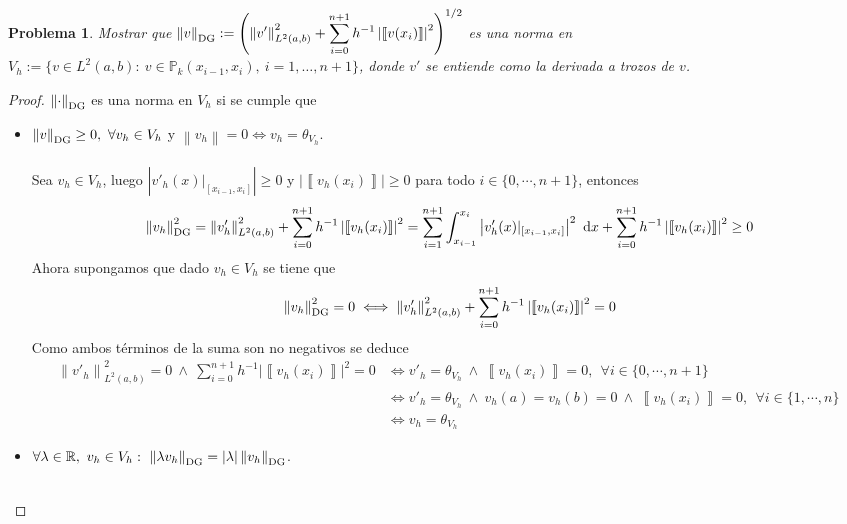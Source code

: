 \documentclass[10pt,a4paper]{report}
\newtheorem{pro}{Problema}
\newcommand{\dx}{\textup{d}x}
\providecommand{\abs}[1]{\left\lvert#1\right\rvert}
\providecommand{\norm}[1]{\left\lVert#1\right\rVert}
\providecommand{\salto}[1]{\left\llbracket#1\right\rrbracket}
\begin{document}
    \begin{pro}
    	Mostrar que $\displaystyle \norm{v}_{\textup{DG}} := \left( \norm{v'}^{2}_{L^{2}(a,b)} + \sum_{i=0}^{n+1}h^{-1}\abs{\salto{v(x_{i})}}^{2}  \right)^{1/2}$ es una norma en $V_{h} := \{ v\in L^{2}(a,b):\ v\in \mathbb{P}_{k}(x_{i-1},x_{i}),\ i = 1,\dots,n+1 \}$, donde $v'$ se entiende como la derivada a trozos de $v$.
    \end{pro}
    \begin{proof}
    	$\norm{\cdot}_{\textup{DG}}$ es una norma en $V_{h}$ si se cumple que
    	\begin{itemize}
    		\item[$(i)$] $\norm{v}_{\textup{DG}} \geq 0, \ \forall v_{h}\in V_{h}$ y $\norm{v_{h}} = 0 \iff v_{h} = \theta_{V_{h}}$.\\~\\
    		Sea $v_{h}\in V_{h}$, luego $\abs{v'_{h}(x)\lvert_{[x_{i-1},x_{i}]}}\geq 0$ y $\abs{\salto{v_{h}(x_{i})}}\geq 0$ para todo $i\in\{0,\cdots,n+1\}$, entonces
    		\begin{align*}
    			\norm{v_{h}}^{2}_{\textup{DG}} = \norm{v'_{h}}^{2}_{L^{2}(a,b)} + \sum_{i=0}^{n+1}h^{-1}\abs{\salto{v_{h}(x_{i})}}^{2} = \sum_{i=1}^{n+1}\int_{x_{i-1}}^{x_{i}} \abs{v'_{h}(x)\lvert_{[x_{i-1},x_{i}]}}^{2}\ \dx + \sum_{i=0}^{n+1}h^{-1}\abs{\salto{v_{h}(x_{i})}}^{2} \geq 0
    		\end{align*}
    	    Ahora supongamos que dado $v_{h}\in V_{h}$ se tiene que
    	    \begin{align*}
    	    	\norm{v_{h}}^{2}_{\textup{DG}} = 0 \iff \norm{v'_{h}}^{2}_{L^{2}(a,b)} + \sum_{i=0}^{n+1}h^{-1}\abs{\salto{v_{h}(x_{i})}}^{2} = 0
    	    \end{align*} 
            Como ambos términos de la suma son no negativos se deduce
            \begin{align*}
            	\norm{v'_{h}}^{2}_{L^{2}(a,b)}  = 0 \ \wedge \ \sum_{i=0}^{n+1}h^{-1}\abs{\salto{v_{h}(x_{i})}}^{2} = 0 &\iff v'_{h} = \theta_{V_{h}}\ \wedge \ \salto{v_{h}(x_{i})} = 0,\  \ \forall i\in\{0,\cdots,n+1  \}\\ &\iff v'_{h} = \theta_{V_{h}}\ \wedge \ v_{h}(a) = v_{h}(b) = 0\ \wedge \ \salto{v_{h}(x_{i})} = 0,\  \ \forall i\in\{1,\cdots,n  \}\ \\ &\iff v_{h} = \theta_{V_{h}}
            \end{align*}
            \item[$(ii)$] $\forall \lambda\in \mathbb{R},\ v_{h}\in V_{h}:\ \norm{\lambda v_{h}}_{\textup{DG}} = \abs{\lambda}\norm{v_{h}}_{\textup{DG}}$.\\~\\

\end{itemize}
\end{proof}
\end{document}
